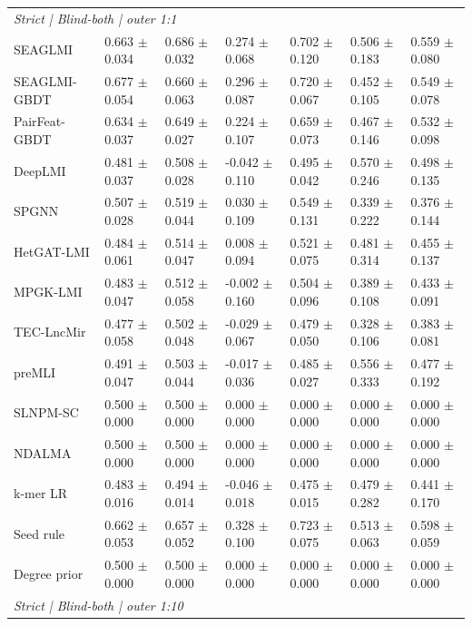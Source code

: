 \begin{landscape}
{\begin{longtable}{lllllll}
\multicolumn{7}{l}{\textit{Strict | Blind-both | outer 1:1}}\\
SEAGLMI & 0.663 $\pm$ 0.034 & 0.686 $\pm$ 0.032 & 0.274 $\pm$ 0.068 & 0.702 $\pm$ 0.120 & 0.506 $\pm$ 0.183 & 0.559 $\pm$ 0.080 \\
SEAGLMI-GBDT & 0.677 $\pm$ 0.054 & 0.660 $\pm$ 0.063 & 0.296 $\pm$ 0.087 & 0.720 $\pm$ 0.067 & 0.452 $\pm$ 0.105 & 0.549 $\pm$ 0.078 \\
PairFeat-GBDT & 0.634 $\pm$ 0.037 & 0.649 $\pm$ 0.027 & 0.224 $\pm$ 0.107 & 0.659 $\pm$ 0.073 & 0.467 $\pm$ 0.146 & 0.532 $\pm$ 0.098 \\
DeepLMI & 0.481 $\pm$ 0.037 & 0.508 $\pm$ 0.028 & -0.042 $\pm$ 0.110 & 0.495 $\pm$ 0.042 & 0.570 $\pm$ 0.246 & 0.498 $\pm$ 0.135 \\
SPGNN & 0.507 $\pm$ 0.028 & 0.519 $\pm$ 0.044 & 0.030 $\pm$ 0.109 & 0.549 $\pm$ 0.131 & 0.339 $\pm$ 0.222 & 0.376 $\pm$ 0.144 \\
HetGAT-LMI & 0.484 $\pm$ 0.061 & 0.514 $\pm$ 0.047 & 0.008 $\pm$ 0.094 & 0.521 $\pm$ 0.075 & 0.481 $\pm$ 0.314 & 0.455 $\pm$ 0.137 \\
MPGK-LMI & 0.483 $\pm$ 0.047 & 0.512 $\pm$ 0.058 & -0.002 $\pm$ 0.160 & 0.504 $\pm$ 0.096 & 0.389 $\pm$ 0.108 & 0.433 $\pm$ 0.091 \\
TEC-LncMir & 0.477 $\pm$ 0.058 & 0.502 $\pm$ 0.048 & -0.029 $\pm$ 0.067 & 0.479 $\pm$ 0.050 & 0.328 $\pm$ 0.106 & 0.383 $\pm$ 0.081 \\
preMLI & 0.491 $\pm$ 0.047 & 0.503 $\pm$ 0.044 & -0.017 $\pm$ 0.036 & 0.485 $\pm$ 0.027 & 0.556 $\pm$ 0.333 & 0.477 $\pm$ 0.192 \\
SLNPM-SC & 0.500 $\pm$ 0.000 & 0.500 $\pm$ 0.000 & 0.000 $\pm$ 0.000 & 0.000 $\pm$ 0.000 & 0.000 $\pm$ 0.000 & 0.000 $\pm$ 0.000 \\
NDALMA & 0.500 $\pm$ 0.000 & 0.500 $\pm$ 0.000 & 0.000 $\pm$ 0.000 & 0.000 $\pm$ 0.000 & 0.000 $\pm$ 0.000 & 0.000 $\pm$ 0.000 \\
k-mer LR & 0.483 $\pm$ 0.016 & 0.494 $\pm$ 0.014 & -0.046 $\pm$ 0.018 & 0.475 $\pm$ 0.015 & 0.479 $\pm$ 0.282 & 0.441 $\pm$ 0.170 \\
Seed rule & 0.662 $\pm$ 0.053 & 0.657 $\pm$ 0.052 & 0.328 $\pm$ 0.100 & 0.723 $\pm$ 0.075 & 0.513 $\pm$ 0.063 & 0.598 $\pm$ 0.059 \\
Degree prior & 0.500 $\pm$ 0.000 & 0.500 $\pm$ 0.000 & 0.000 $\pm$ 0.000 & 0.000 $\pm$ 0.000 & 0.000 $\pm$ 0.000 & 0.000 $\pm$ 0.000 \\
\multicolumn{7}{l}{\textit{Strict | Blind-both | outer 1:10}}\\

\end{longtable}}
\end{landscape}

